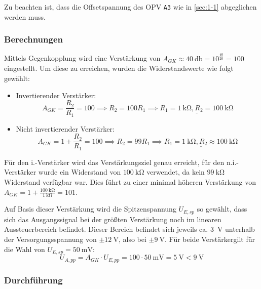 Zu beachten ist, dass die Offsetspannung des OPV \texttt{A3} wie in
\autoref{sec:1-1} abgeglichen werden muss.

\subsubsection{Berechnungen}

Mittels Gegenkopplung wird eine Verstärkung von $A_{GK}\approx\SI{40}{\decibel}
= 10^{\frac{40}{20}} = 100$ eingestellt. Um diese zu erreichen, wurden die
Widerstandswerte wie folgt gewählt:

\begin{itemize}
	\item Invertierender Verstärker:
	\begin{equation*}
		A_{GK} = \frac{R_2}{R_1} = 100 \implies R_2 = 100 R_1 \implies \underline{R_1 = \SI{1}{\kilo\ohm}, R_2 = \SI{100}{\kilo\ohm}}
	\end{equation*}
	\item Nicht invertierender Verstärker:
	\begin{equation*}
		A_{GK} = 1 + \frac{R_2}{R_1} = 100 \implies R_2 = 99 R_1 \implies \underline{R_1 = \SI{1}{\kilo\ohm}, R_2 \approx \SI{100}{\kilo\ohm}}
	\end{equation*}
\end{itemize}

Für den i.-Verstärker wird das Verstärkungsziel genau erreicht, für den n.i.-Verstärker wurde ein Widerstand von $\SI{100}{\kilo\ohm}$ verwendet, da kein $\SI{99}{\kilo\ohm}$ Widerstand verfügbar war. Dies führt zu einer minimal höheren Verstärkung von $A_{GK} = 1 + \frac{\SI{100}{\kilo\ohm}}{\SI{1}{\kilo\ohm}} = 101$.

Auf Basis dieser Verstärkung wird die Spitzenspannung $U_{E,sp}$ so gewählt,
dass sich das Ausgangssignal bei der größten Verstärkung noch im linearen
Aussteuerbereich befindet. Dieser Bereich befindet sich jeweils ca.
\SI{3}{\volt} unterhalb der Versorgungsspannung \cite[S.~66]{EMTPraktikum2025}
von $\pm \SI{12}{\volt}$, also bei $\pm \SI{9}{\volt}$. Für beide
Verstärkergilt für die Wahl von
$U_{E,sp}=\SI{50}{\milli\volt}$:
\begin{equation*}
	U_{A,pp} = A_{GK} \cdot U_{E,pp} = 100 \cdot \SI{50}{\milli\volt} = \SI{5}{\volt} < \SI{9}{\volt}
\end{equation*}

\subsubsection{Durchführung}

